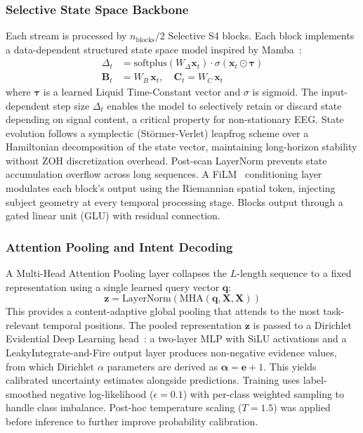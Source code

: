 \documentclass[11pt,a4paper]{article}
\begin{document}
\subsubsection{Selective State Space Backbone}

Each stream is processed by $n_\text{blocks}/2$ Selective S4 blocks.
Each block implements a data-dependent structured state space model inspired
by Mamba~\cite{Gu2023Mamba}:
\begin{align}
    \Delta_t &= \text{softplus}(W_\Delta \mathbf{x}_t)\cdot
                \sigma(\mathbf{x}_t \odot \boldsymbol{\tau}) \\
    \mathbf{B}_t &= W_B\,\mathbf{x}_t, \quad
    \mathbf{C}_t = W_C\,\mathbf{x}_t
\end{align}
where $\boldsymbol{\tau}$ is a learned Liquid Time-Constant vector and
$\sigma$ is sigmoid.
The input-dependent step size $\Delta_t$ enables the model to selectively
retain or discard state depending on signal content, a critical property for
non-stationary EEG.
State evolution follows a symplectic (Störmer-Verlet) leapfrog scheme over
a Hamiltonian decomposition of the state vector, maintaining long-horizon
stability without ZOH discretization overhead.
Post-scan LayerNorm prevents state accumulation overflow across long sequences.
A FiLM~\cite{Perez2018} conditioning layer modulates each block's output using
the Riemannian spatial token, injecting subject geometry at every temporal
processing stage.
Blocks output through a gated linear unit (GLU) with residual connection.

\subsubsection{Attention Pooling and Intent Decoding}

A Multi-Head Attention Pooling layer collapses the $L$-length sequence to a
fixed representation using a single learned query vector $\mathbf{q}$:
\begin{equation}
    \mathbf{z} = \mathrm{LayerNorm}\!\left(
        \mathrm{MHA}(\mathbf{q}, \mathbf{X}, \mathbf{X})
    \right)
\end{equation}
This provides a content-adaptive global pooling that attends to the most
task-relevant temporal positions.
The pooled representation $\mathbf{z}$ is passed to a Dirichlet Evidential
Deep Learning head~\cite{Sensoy2018}: a two-layer MLP with SiLU activations
and a LeakyIntegrate-and-Fire output layer produces non-negative evidence
values, from which Dirichlet $\alpha$ parameters are derived as
$\boldsymbol{\alpha} = \mathbf{e} + 1$.
This yields calibrated uncertainty estimates alongside predictions.
Training uses label-smoothed negative log-likelihood ($\epsilon = 0.1$) with
per-class weighted sampling to handle class imbalance.
Post-hoc temperature scaling ($T = 1.5$) was applied before inference to
further improve probability calibration.
\end{document}
